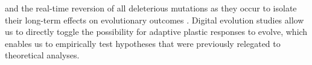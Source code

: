 and the real-time reversion of all deleterious mutations as they occur to isolate their long-term effects on evolutionary outcomes \citep{covert_experiments_2013}. 
Digital evolution studies allow us to directly toggle the possibility for adaptive plastic responses to evolve, which enables us to empirically test hypotheses that were previously relegated to theoretical analyses.


